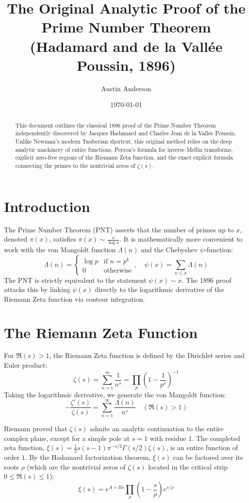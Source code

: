 \documentclass[12pt]{article}
\title{The Original Analytic Proof of the Prime Number Theorem \\ (Hadamard and de la Vall\'ee Poussin, 1896)}
\author{Austin Anderson}
\date{\today}
\begin{document}
\maketitle

\begin{abstract}
This document outlines the classical 1896 proof of the Prime Number Theorem independently discovered by Jacques Hadamard and Charles Jean de la Vall\'ee Poussin. Unlike Newman's modern Tauberian shortcut, this original method relies on the deep analytic machinery of entire functions, Perron's formula for inverse Mellin transforms, explicit zero-free regions of the Riemann Zeta function, and the exact explicit formula connecting the primes to the nontrivial zeros of $\zeta(s)$.
\end{abstract}

\section{Introduction}
The Prime Number Theorem (PNT) asserts that the number of primes up to $x$, denoted $\pi(x)$, satisfies $\pi(x) \sim \frac{x}{\log x}$. It is mathematically more convenient to work with the von Mangoldt function $\Lambda(n)$ and the Chebyshev $\psi$-function:
\[ \Lambda(n) = \begin{cases} \log p & \text{if } n = p^k \\ 0 & \text{otherwise} \end{cases}, \quad \psi(x) = \sum_{n \le x} \Lambda(n) \]
The PNT is strictly equivalent to the statement $\psi(x) \sim x$. The 1896 proof attacks this by linking $\psi(x)$ directly to the logarithmic derivative of the Riemann Zeta function via contour integration.

\section{The Riemann Zeta Function}
For $\Re(s) > 1$, the Riemann Zeta function is defined by the Dirichlet series and Euler product:
\[ \zeta(s) = \sum_{n=1}^\infty \frac{1}{n^s} = \prod_p \left(1 - \frac{1}{p^s}\right)^{-1} \]
Taking the logarithmic derivative, we generate the von Mangoldt function:
\[ -\frac{\zeta'(s)}{\zeta(s)} = \sum_{n=1}^\infty \frac{\Lambda(n)}{n^s} \quad (\Re(s) > 1) \]

Riemann proved that $\zeta(s)$ admits an analytic continuation to the entire complex plane, except for a simple pole at $s = 1$ with residue $1$. The completed zeta function, $\xi(s) = \frac{1}{2} s(s-1) \pi^{-s/2} \Gamma(s/2) \zeta(s)$, is an entire function of order $1$. By the Hadamard factorization theorem, $\xi(s)$ can be factored over its roots $\rho$ (which are the nontrivial zeros of $\zeta(s)$ located in the critical strip $0 \le \Re(s) \le 1$):
\[ \xi(s) = e^{A + Bs} \prod_{\rho} \left(1 - \frac{s}{\rho}\right) e^{s/\rho} \]
\end{document}
